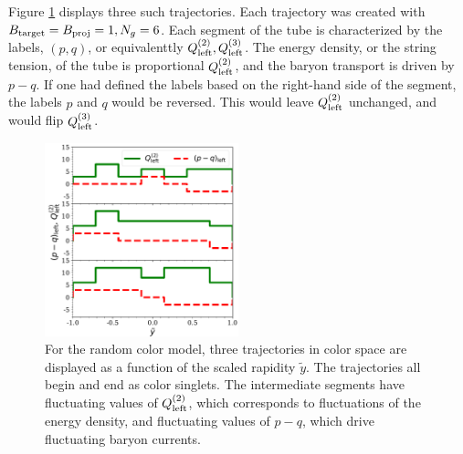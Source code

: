 \documentclass[aps, prc, 12pt, nofootinbib, showpacs, superscriptaddress, tightenlines, groupedaddress]{revtex4-2}
\begin{document}
Figure \ref{fig:sampletrajectories} displays three such trajectories. Each trajectory was created with $B_{\rm target}=B_{\rm proj}=1, N_g=6$. Each segment of the tube is characterized by the labels, $(p,q)$, or equivalenttly $Q^{(2)}_{\rm left},Q^{(3)}_{\rm left}$. The energy density, or the string tension, of the tube is proportional $Q^{(2)}_{\rm left}$, and the baryon transport is driven by $p-q$. If one had defined the labels based on the right-hand side of the segment, the labels $p$ and $q$ would be reversed. This would leave $Q^{(2)}_{\rm left}$ unchanged, and would flip $Q^{(3)}_{\rm left}$. 
\begin{figure}
\centerline{\includegraphics[width=0.5\textwidth]{figs/sample_trajectories.pdf}}
\caption{\label{fig:sampletrajectories}
For the random color model, three trajectories in color space are displayed as a function of the scaled rapidity $\tilde{y}$. The trajectories all begin and end as color singlets. The intermediate segments have fluctuating values of $Q^{(2)}_{\rm left}$, which corresponds to fluctuations of the energy density, and fluctuating values of $p-q$, which drive fluctuating baryon currents.
}
\end{figure}
\end{document}
